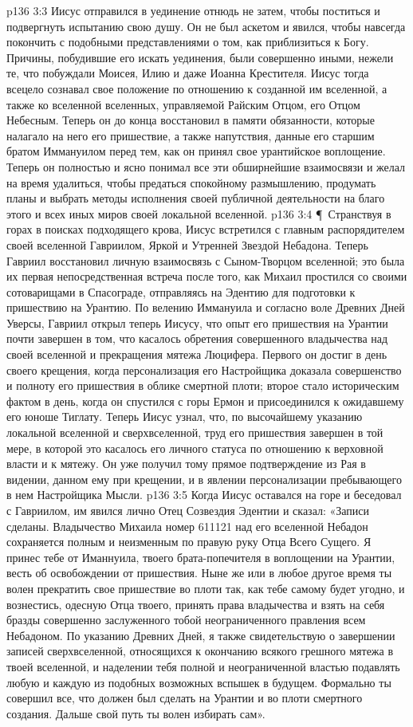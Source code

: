 \vs p136 3:3 Иисус отправился в уединение отнюдь не затем, чтобы поститься и подвергнуть испытанию свою душу. Он не был аскетом и явился, чтобы навсегда покончить с подобными представлениями о том, как приблизиться к Богу. Причины, побудившие его искать уединения, были совершенно иными, нежели те, что побуждали Моисея, Илию и даже Иоанна Крестителя. Иисус тогда всецело сознавал свое положение по отношению к созданной им вселенной, а также ко вселенной вселенных, управляемой Райским Отцом, его Отцом Небесным. Теперь он до конца восстановил в памяти обязанности, которые налагало на него его пришествие, а также напутствия, данные его старшим братом Иммануилом перед тем, как он принял свое урантийское воплощение. Теперь он полностью и ясно понимал все эти обширнейшие взаимосвязи и желал на время удалиться, чтобы предаться спокойному размышлению, продумать планы и выбрать методы исполнения своей публичной деятельности на благо этого и всех иных миров своей локальной вселенной.
\vs p136 3:4 \P\ Странствуя в горах в поисках подходящего крова, Иисус встретился с главным распорядителем своей вселенной Гавриилом, Яркой и Утренней Звездой Небадона. Теперь Гавриил восстановил личную взаимосвязь с Сыном\hyp{}Творцом вселенной; это была их первая непосредственная встреча после того, как Михаил простился со своими сотоварищами в Спасограде, отправляясь на Эдентию для подготовки к пришествию на Урантию. По велению Иммануила и согласно воле Древних Дней Уверсы, Гавриил открыл теперь Иисусу, что опыт его пришествия на Урантии почти завершен в том, что касалось обретения совершенного владычества над своей вселенной и прекращения мятежа Люцифера. Первого он достиг в день своего крещения, когда персонализация его Настройщика доказала совершенство и полноту его пришествия в облике смертной плоти; второе стало историческим фактом в день, когда он спустился с горы Ермон и присоединился к ожидавшему его юноше Тиглату. Теперь Иисус узнал, что, по высочайшему указанию локальной вселенной и сверхвселенной, труд его пришествия завершен в той мере, в которой это касалось его личного статуса по отношению к верховной власти и к мятежу. Он уже получил тому прямое подтверждение из Рая в видении, данном ему при крещении, и в явлении персонализации пребывающего в нем Настройщика Мысли.
\vs p136 3:5 Когда Иисус оставался на горе и беседовал с Гавриилом, им явился лично Отец Созвездия Эдентии и сказал: «Записи сделаны. Владычество Михаила номер 611121 над его вселенной Небадон сохраняется полным и неизменным по правую руку Отца Всего Сущего. Я принес тебе от Иманнуила, твоего брата\hyp{}попечителя в воплощении на Урантии, весть об освобождении от пришествия. Ныне же или в любое другое время ты волен прекратить свое пришествие во плоти так, как тебе самому будет угодно, и вознестись, одесную Отца твоего, принять права владычества и взять на себя бразды совершенно заслуженного тобой неограниченного правления всем Небадоном. По указанию Древних Дней, я также свидетельствую о завершении записей сверхвселенной, относящихся к окончанию всякого грешного мятежа в твоей вселенной, и наделении тебя полной и неограниченной властью подавлять любую и каждую из подобных возможных вспышек в будущем. Формально ты совершил все, что должен был сделать на Урантии и во плоти смертного создания. Дальше свой путь ты волен избирать сам».
